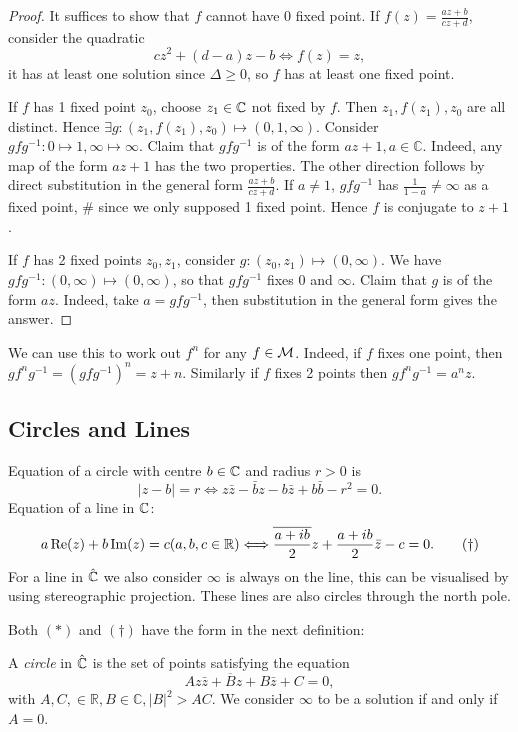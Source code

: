 \documentclass[10pt]{article}
\def\ge{\geqslant}
\begin{document}
      \begin{proof}
            It suffices to show that $f$ cannot have 0 fixed point.
            If $ f(z)=\frac{az+b}{cz+d} $, consider the quadratic
            \[
                cz^2+(d-a)z-b \Longleftrightarrow f(z)=z,
            \]
            it has at least one solution since $ \Delta\ge 0 $, so $f$ has at least one fixed point.

            If $f$ has 1 fixed point $z_0$, choose $z_1\in {\mathbb{C}}$ not fixed by $f$. Then $ z_1,f(z_1),z_0 $ are all distinct. Hence $ \exists g:(z_1,f(z_1),z_0)\mapsto (0,1,\infty) $. Consider $ gfg^{-1}: 0 \mapsto 1, \infty \mapsto \infty $. Claim that $gfg^{-1}$ is of the form $ az+1,a\in \mathbb{C} $. Indeed, any map of the form $az+1$ has the two properties. The other direction follows by direct substitution in the general form $\frac{az+b}{cz+d}$. If $a\neq 1$, $gfg^{-1}$ has $ \frac{1}{1-a}\neq \infty  $ as a fixed point, \# since we only supposed 1 fixed point. Hence $f$ is conjugate to $z+1$.
            
            If $f$ has 2 fixed points $z_0,z_1$, consider $ g:(z_0,z_1) \mapsto (0,\infty ) $. We have $ gfg^{-1}:(0,\infty ) \mapsto (0,\infty ) $, so that $gfg^{-1}$ fixes $0$ and $\infty$. Claim that $g$ is of the form $az$. Indeed, take $ a=gfg^{-1} $, then substitution in the general form gives the answer.
      \end{proof}
      We can use this to work out $f^n$ for any $ f\in {\mathcal{M}} $. Indeed, if $f$ fixes one point, then $gf^ng^{-1}=(gfg^{-1})^n=z+n$. Similarly if $f$ fixes 2 points then $ gf^ng^{-1}=a^n z $.
      \subsection{Circles and Lines}
      Equation of a circle with centre $b\in {\mathbb{C}}$ and radius $r>0$ is 
      \[
          |z-b|=r \Longleftrightarrow z \bar{z}- \bar{b}z-b \bar{z}+ b \bar{b}-r^2=0.\tag{$*$}
      \]
      Equation of a line in ${\mathbb{C}}$:
      \[
          a \Re (z)+b \Im (z)=c(a,b,c\in {\mathbb{R}}) \Longleftrightarrow \overline{\frac{a+ib}{2}}z+\frac{a+ib}{2}\bar{z}-c=0.\tag{$ \dagger $}
      \]
      For a line in $ \hat{{\mathbb{C}}} $ we also consider $ \infty  $ is always on the line, this can be visualised by using stereographic projection. These lines are also circles through the north pole.

      Both $ (*) $ and $(\dagger)$ have the form in the next definition:
      \begin{definition}
          A \textit{circle} in $ \hat{{\mathbb{C}}} $ is the set of points satisfying the equation
          \[
              Az \bar{z}+ \overline{B}z+B \bar{z}+C=0,
          \]
          with $ A,C,\in \mathbb{R}, B\in \mathbb{C}, |B|^2>AC $. We consider $ \infty  $ to be a solution if and only if $A=0$.
      \end{definition}
      
\end{document}
